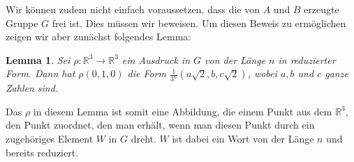 \documentclass[10pt]{article}
\newtheorem{lemma}[satz]{Lemma}
\begin{document}
\noindent Wir können zudem nicht einfach voraussetzen, dass die von $A$ und $B$ erzeugte Gruppe $G$ frei ist. Dies müssen wir beweisen. Um diesen Beweis zu ermöglichen zeigen wir aber zunächst folgendes Lemma:
\begin{lemma}\label{lemma1}
    Sei $\rho : \mathbb{R}^3 \rightarrow \mathbb{R}^3$ ein Ausdruck in $G$ von der Länge $n$ in reduzierter Form. Dann hat $\rho (0,1,0)$ die Form $\frac{1}{3^n}(a\sqrt{2},b,c\sqrt{2})$, wobei $a,b$ und $c$ ganze Zahlen sind.
\end{lemma}
\noindent Das $\rho$ in diesem Lemma ist somit eine Abbildung, die einem Punkt aus dem $\mathbb{R}^3$, den Punkt zuordnet, den man erhält, wenn man diesen Punkt durch ein zugehöriges Element $W$ in $G$ dreht. $W$ ist dabei ein Wort von der Länge $n$ und bereits reduziert.\par
\end{document}
